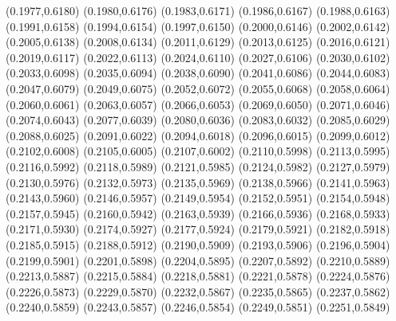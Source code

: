 \PST@Cross(0.1977,0.6180)
\PST@Cross(0.1980,0.6176)
\PST@Cross(0.1983,0.6171)
\PST@Cross(0.1986,0.6167)
\PST@Cross(0.1988,0.6163)
\PST@Cross(0.1991,0.6158)
\PST@Cross(0.1994,0.6154)
\PST@Cross(0.1997,0.6150)
\PST@Cross(0.2000,0.6146)
\PST@Cross(0.2002,0.6142)
\PST@Cross(0.2005,0.6138)
\PST@Cross(0.2008,0.6134)
\PST@Cross(0.2011,0.6129)
\PST@Cross(0.2013,0.6125)
\PST@Cross(0.2016,0.6121)
\PST@Cross(0.2019,0.6117)
\PST@Cross(0.2022,0.6113)
\PST@Cross(0.2024,0.6110)
\PST@Cross(0.2027,0.6106)
\PST@Cross(0.2030,0.6102)
\PST@Cross(0.2033,0.6098)
\PST@Cross(0.2035,0.6094)
\PST@Cross(0.2038,0.6090)
\PST@Cross(0.2041,0.6086)
\PST@Cross(0.2044,0.6083)
\PST@Cross(0.2047,0.6079)
\PST@Cross(0.2049,0.6075)
\PST@Cross(0.2052,0.6072)
\PST@Cross(0.2055,0.6068)
\PST@Cross(0.2058,0.6064)
\PST@Cross(0.2060,0.6061)
\PST@Cross(0.2063,0.6057)
\PST@Cross(0.2066,0.6053)
\PST@Cross(0.2069,0.6050)
\PST@Cross(0.2071,0.6046)
\PST@Cross(0.2074,0.6043)
\PST@Cross(0.2077,0.6039)
\PST@Cross(0.2080,0.6036)
\PST@Cross(0.2083,0.6032)
\PST@Cross(0.2085,0.6029)
\PST@Cross(0.2088,0.6025)
\PST@Cross(0.2091,0.6022)
\PST@Cross(0.2094,0.6018)
\PST@Cross(0.2096,0.6015)
\PST@Cross(0.2099,0.6012)
\PST@Cross(0.2102,0.6008)
\PST@Cross(0.2105,0.6005)
\PST@Cross(0.2107,0.6002)
\PST@Cross(0.2110,0.5998)
\PST@Cross(0.2113,0.5995)
\PST@Cross(0.2116,0.5992)
\PST@Cross(0.2118,0.5989)
\PST@Cross(0.2121,0.5985)
\PST@Cross(0.2124,0.5982)
\PST@Cross(0.2127,0.5979)
\PST@Cross(0.2130,0.5976)
\PST@Cross(0.2132,0.5973)
\PST@Cross(0.2135,0.5969)
\PST@Cross(0.2138,0.5966)
\PST@Cross(0.2141,0.5963)
\PST@Cross(0.2143,0.5960)
\PST@Cross(0.2146,0.5957)
\PST@Cross(0.2149,0.5954)
\PST@Cross(0.2152,0.5951)
\PST@Cross(0.2154,0.5948)
\PST@Cross(0.2157,0.5945)
\PST@Cross(0.2160,0.5942)
\PST@Cross(0.2163,0.5939)
\PST@Cross(0.2166,0.5936)
\PST@Cross(0.2168,0.5933)
\PST@Cross(0.2171,0.5930)
\PST@Cross(0.2174,0.5927)
\PST@Cross(0.2177,0.5924)
\PST@Cross(0.2179,0.5921)
\PST@Cross(0.2182,0.5918)
\PST@Cross(0.2185,0.5915)
\PST@Cross(0.2188,0.5912)
\PST@Cross(0.2190,0.5909)
\PST@Cross(0.2193,0.5906)
\PST@Cross(0.2196,0.5904)
\PST@Cross(0.2199,0.5901)
\PST@Cross(0.2201,0.5898)
\PST@Cross(0.2204,0.5895)
\PST@Cross(0.2207,0.5892)
\PST@Cross(0.2210,0.5889)
\PST@Cross(0.2213,0.5887)
\PST@Cross(0.2215,0.5884)
\PST@Cross(0.2218,0.5881)
\PST@Cross(0.2221,0.5878)
\PST@Cross(0.2224,0.5876)
\PST@Cross(0.2226,0.5873)
\PST@Cross(0.2229,0.5870)
\PST@Cross(0.2232,0.5867)
\PST@Cross(0.2235,0.5865)
\PST@Cross(0.2237,0.5862)
\PST@Cross(0.2240,0.5859)
\PST@Cross(0.2243,0.5857)
\PST@Cross(0.2246,0.5854)
\PST@Cross(0.2249,0.5851)
\PST@Cross(0.2251,0.5849)
